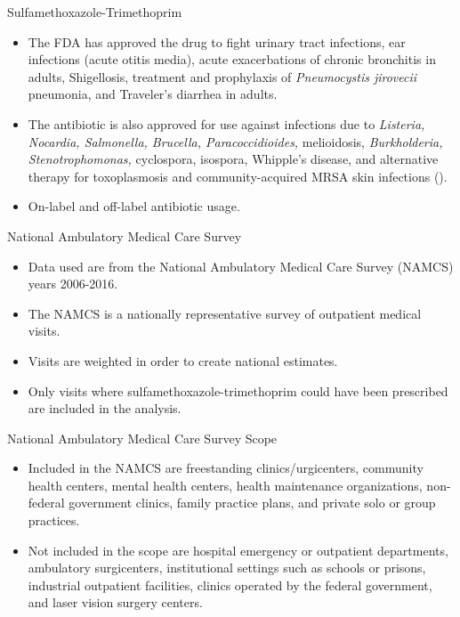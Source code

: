 \documentclass{beamer}
\begin{document}
\begin{frame}{Sulfamethoxazole-Trimethoprim}
\begin{itemize}
\item The FDA has approved the drug to fight urinary tract infections, ear infections (acute otitis media), acute exacerbations of chronic bronchitis in adults, Shigellosis, treatment and prophylaxis of \textit{Pneumocystis jirovecii} pneumonia, and Traveler's diarrhea in adults.
\item The antibiotic is also approved for use against infections due to \textit{Listeria, Nocardia, Salmonella, Brucella, Paracoccidioides,} melioidosis, \textit{Burkholderia, Stenotrophomonas,} cyclospora, isospora, Whipple's disease, and alternative therapy for toxoplasmosis and community-acquired MRSA skin infections (\cite{schlossberg_antibiotics_2017}).
\item On-label and off-label antibiotic usage.
\end{itemize}
\end{frame}

\begin{frame}{National Ambulatory Medical Care Survey}
\begin{itemize}
\item Data used are from the National Ambulatory Medical Care Survey (NAMCS) years 2006-2016.
\item The NAMCS is a nationally representative survey of outpatient medical visits.
\item Visits are weighted in order to create national estimates.
\item Only visits where sulfamethoxazole-trimethoprim could have been prescribed are included in the analysis.
\end{itemize}
\end{frame}

\begin{frame}{National Ambulatory Medical Care Survey Scope}
\begin{itemize}
\item Included in the NAMCS are freestanding clinics/urgicenters, community health centers, mental health centers, health maintenance organizations,  non-federal government clinics, family practice plans, and private solo or group practices.
\item Not included in the scope are hospital emergency or outpatient departments, ambulatory surgicenters, institutional settings such as schools or prisons, industrial outpatient facilities, clinics operated by the federal government, and laser vision surgery centers.
\end{itemize}
\end{frame}
\end{document}
